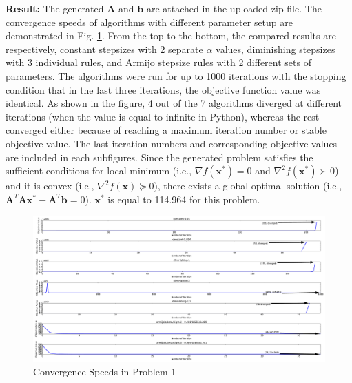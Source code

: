 \documentclass[11pt]{article}
\newcommand\result{\vspace{.10in}\textbf{Result: }}
\begin{document}
\result The generated $\mathbf{A}$ and $\mathbf{b}$ are attached in the uploaded zip file. The convergence speeds of algorithms with different parameter setup are demonstrated in Fig. \ref{convergence1}. From the top to the bottom, the compared results are respectively, constant stepsizes with 2 separate $\alpha$ values, diminishing stepsizes with 3 individual rules, and Armijo stepsize rules with 2 different sets of parameters. The algorithms were run for up to 1000 iterations with the stopping condition that in the last three iterations, the objective function value was identical. As shown in the figure, 4 out of the 7 algorithms diverged at different iterations (when the value is equal to infinite in Python), whereas the rest converged either because of reaching a maximum iteration number or stable objective value. The last iteration numbers and corresponding objective values are included in each subfigures. Since the generated problem satisfies the sufficient conditions for local minimum (i.e., $\nabla f(\mathbf{x}^*)=0$ and $\nabla^2 f(\mathbf{x}^*)\succ0$) and it is convex (i.e., $\nabla^2 f(\mathbf{x})\succeq0$), there exists a global optimal solution (i.e., $\mathbf{A}^T\mathbf{A}\mathbf{x}^*-\mathbf{A}^T\mathbf{b}=0$). $\mathbf{x}^*$ is equal to 114.964 for this problem.
\begin{figure}[!tb]
\centering
\includegraphics[width=6.3in]{randomly_generated_problem.pdf}
\caption{Convergence Speeds in Problem 1}
\label{convergence1}
\end{figure}
\end{document}
